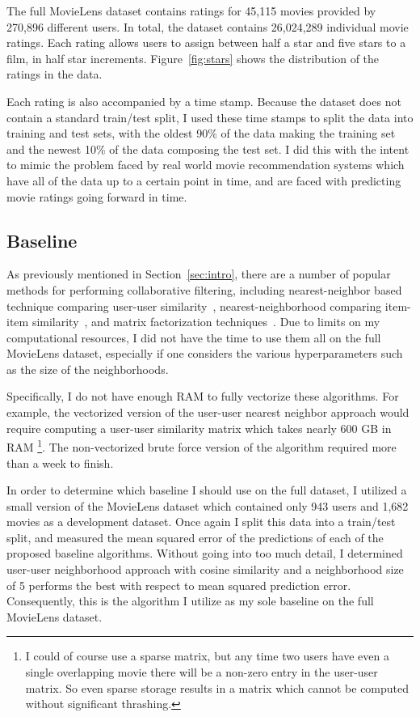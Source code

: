 \documentclass[12pt]{article}
\begin{document}
The full MovieLens dataset contains ratings for 45,115 movies provided by
270,896 different users.
In total, the dataset contains 26,024,289 individual movie ratings.
Each rating allows users to assign between half a star and five stars to a
film, in half star increments.
Figure~\ref{fig:stars} shows the distribution of the ratings in the data.

Each rating is also accompanied by a time stamp.
Because the dataset does not contain a standard train/test split,
I used these time stamps to split the data into training and test sets, with
the oldest 90\% of the data making the training set and the newest 10\% of the
data composing the test set.
I did this with the intent to mimic the problem faced by real world movie
recommendation systems which have all of the data up to a certain point in
time, and are faced with predicting movie ratings going forward in time.

\subsection{Baseline}

As previously mentioned in Section~\ref{sec:intro}, there are a number of
popular methods for performing collaborative filtering,
including nearest-neighbor based technique comparing user-user
similarity~\cite{user-user},
nearest-neighborhood comparing item-item similarity~\cite{item-item},
and matrix factorization techniques~\cite{matrix-factorization}.
Due to limits on my computational resources, I did not have the time to use
them all on the full MovieLens dataset, especially if one considers the
various hyperparameters such as the size of the neighborhoods.

Specifically, I do not have enough RAM to fully vectorize these
algorithms.
For example, the vectorized version of the user-user nearest neighbor approach
would require computing a user-user similarity matrix which takes nearly 600 GB
in RAM%
\footnote{I could of course use a sparse matrix, but any time two users have
even a single overlapping movie there will be a non-zero entry in the
user-user matrix. So even sparse storage results in a matrix which cannot be
computed without significant thrashing.}.
The non-vectorized brute force version of the algorithm required more than a
week to finish.

In order to determine which baseline I should use on the full dataset, I
utilized a small version of the MovieLens dataset which contained only 943
users and 1,682 movies as a development dataset.
Once again I split this data into a train/test split, and measured the mean
squared error of the predictions of each of the proposed baseline algorithms.
Without going into too much detail, I determined user-user neighborhood
approach with cosine similarity and a neighborhood size of 5 performs the best
with respect to mean squared prediction error.
Consequently, this is the algorithm I utilize as my sole baseline on
the full MovieLens dataset.
\end{document}
